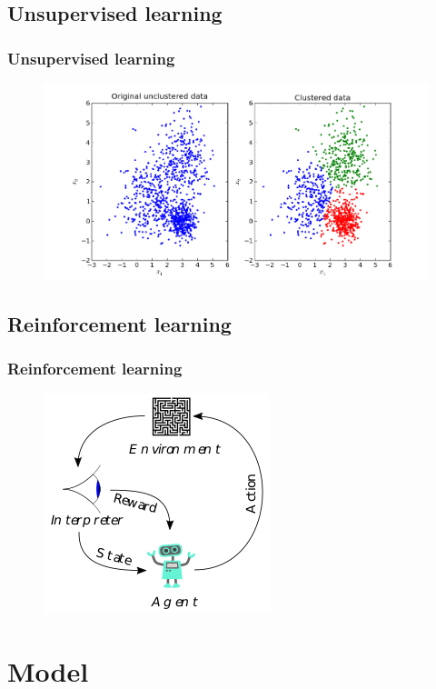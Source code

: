 \documentclass[]{beamer}
\begin{document}
\subsection{Unsupervised learning}

\begin{frame}
\frametitle{Unsupervised learning}
\begin{figure}
\includegraphics[scale=.3]{imgs/kmeans.png}
\end{figure}
\end{frame}

\subsection{Reinforcement learning}

\begin{frame}
\frametitle{Reinforcement learning}
\begin{figure}
\includegraphics[scale=.7]{imgs/reinforcement_learning.png}
\end{figure}
\end{frame}

\section{Model}
\end{document}
